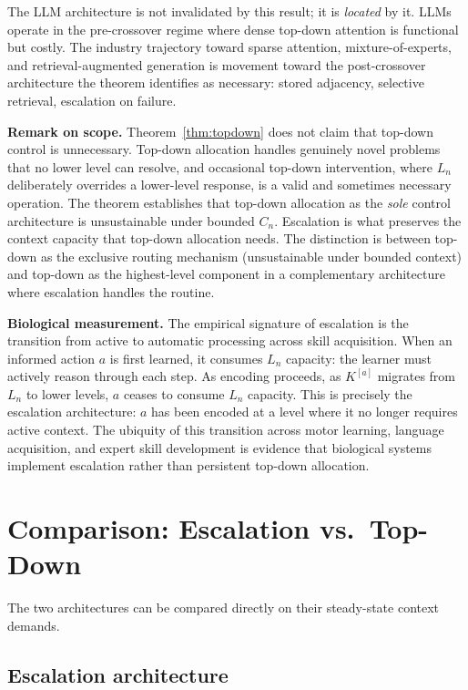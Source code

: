 \documentclass[11pt]{article}
\theoremstyle{definition}
\begin{document}
The LLM architecture is not invalidated by this result; it is
\emph{located} by it. LLMs operate in the pre-crossover regime where
dense top-down attention is functional but costly. The industry
trajectory toward sparse attention, mixture-of-experts, and
retrieval-augmented generation is movement toward the post-crossover
architecture the theorem identifies as necessary: stored adjacency,
selective retrieval, escalation on failure.

\textbf{Remark on scope.} Theorem~\ref{thm:topdown} does not claim
that top-down control is unnecessary. Top-down allocation handles
genuinely novel problems that no lower level can resolve, and
occasional top-down intervention, where $L_n$ deliberately overrides a
lower-level response, is a valid and sometimes necessary operation. The
theorem establishes that top-down allocation as the \emph{sole} control
architecture is unsustainable under bounded $C_n$. Escalation is what
preserves the context capacity that top-down allocation needs. The
distinction is between top-down as the exclusive routing mechanism
(unsustainable under bounded context) and top-down as the
highest-level component in a complementary architecture where
escalation handles the routine.

\textbf{Biological measurement.} The empirical signature of escalation
is the transition from active to automatic processing across skill
acquisition. When an informed action $a$ is first learned, it consumes
$L_n$ capacity: the learner must actively reason through each step. As
encoding proceeds, as $K^{[a]}$ migrates from $L_n$ to lower levels,
$a$ ceases to consume $L_n$ capacity. This is precisely the
escalation architecture: $a$ has been encoded at a level where it no
longer requires active context. The ubiquity of this transition across
motor learning, language acquisition, and expert skill development
\cite{Kahneman2011} is evidence that biological systems implement
escalation rather than persistent top-down allocation.

\section{Comparison: Escalation vs.\ Top-Down}
\label{sec:comparison}

The two architectures can be compared directly on their steady-state
context demands.

\subsection{Escalation architecture}
\end{document}
